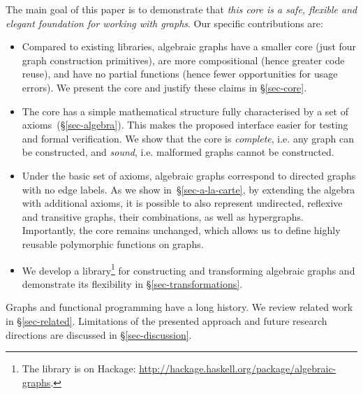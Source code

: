 The main goal of this paper is to demonstrate that \emph{this core is a safe, flexible
and elegant foundation for working with graphs}. Our specific contributions are:
\begin{itemize}
  \item Compared to existing libraries, algebraic graphs have a smaller
  core (just four graph construction primitives), are more compositional
  (hence greater code reuse), and have no partial functions (hence fewer
  opportunities for usage errors). We present the core and justify these claims
  in \S\ref{sec-core}.
  \vspace{0.5mm}

  \item The core has a simple mathematical structure fully characterised
  by a set of axioms~(\S\ref{sec-algebra}). This makes the
  proposed interface easier for testing and formal verification. We show that
  the core is \emph{complete}, i.e. any graph can be constructed, and \emph{sound},
  i.e. malformed graphs cannot be constructed.
  \vspace{0.5mm}

  \item Under the basic set of axioms, algebraic graphs correspond to directed
  graphs with no edge labels. As we show in~\S\ref{sec-a-la-carte}, by extending
  the algebra   with additional axioms, it is possible to also represent undirected,
  reflexive and transitive graphs, their combinations, as well as hypergraphs.
  Importantly, the core remains unchanged, which allows us to define highly
  reusable polymorphic functions on graphs.
  \vspace{0.5mm}

  \item We develop a library\footnote{The library is on Hackage:
  \url{http://hackage.haskell.org/package/algebraic-graphs}.}
  for constructing and transforming algebraic graphs and demonstrate its
  flexibility in \S\ref{sec-transformations}.
\end{itemize}

Graphs and functional programming have a long history. We review related
work in \S\ref{sec-related}. Limitations of the presented approach and future
research directions are discussed in \S\ref{sec-discussion}.

